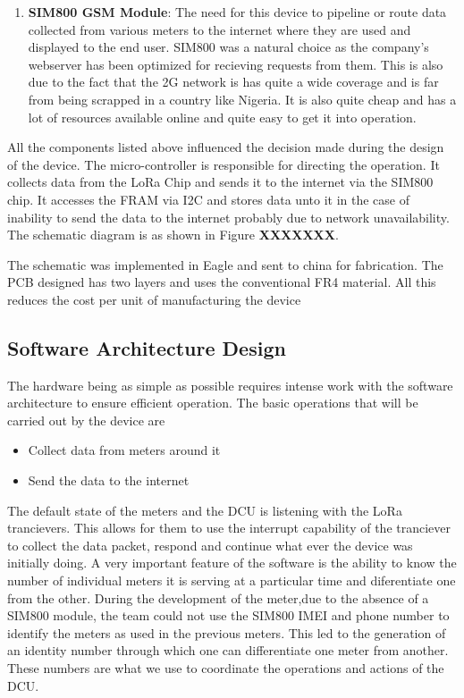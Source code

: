 \begin{enumerate}
\item \textbf{SIM800 GSM Module}: The need for this device to pipeline or route data collected from various meters to the internet where they are used and displayed to the end user. SIM800 was a natural choice as the company's webserver has been optimized for recieving requests from them. This is also due to the fact that the 2G network is has quite a wide coverage and is far from being scrapped in a country like Nigeria. It is also quite cheap and has a lot of resources available online and quite easy to get it into operation. 
\end{enumerate}

All the components listed above influenced the decision made during the design of the device. The micro-controller is responsible for directing the operation. It collects data from the LoRa Chip and sends it to the internet via the SIM800 chip. It accesses the FRAM via I2C and stores data unto it in the case of inability to send the data to the internet probably due to network unavailability. The schematic diagram is as shown in Figure \textbf{XXXXXXX}. 

The schematic was implemented in Eagle and sent to china for fabrication. The PCB designed has two layers and uses the conventional FR4 material. All this reduces the cost per unit of manufacturing the device

\subsection{Software Architecture Design}
The hardware being as simple as possible requires intense work with the software architecture to ensure efficient operation. The basic operations that will be carried out by the device are
\begin{itemize}
\item Collect data from meters around it
\item Send the data to the internet
\end{itemize} 
The default state of the meters and the DCU is listening with the LoRa trancievers. This allows for them to use the interrupt capability of the tranciever to collect the data packet, respond and continue what ever the device was initially doing.
A very important feature of the software is the ability to know the number of individual meters it is serving at a particular time and  diferentiate one from the other. During the development of the meter,due to the absence of a SIM800 module, the team could not use the SIM800 IMEI and phone number to identify the meters as used in the previous meters. This led to the generation of an identity number through which one can differentiate one meter from another. These numbers are what we use to coordinate the operations and actions of the DCU.

